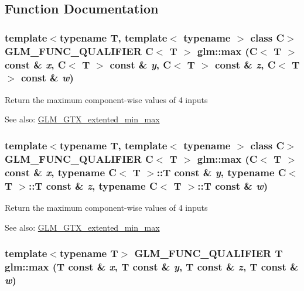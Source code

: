 \subsection{Function Documentation}
\hypertarget{group__gtx__extented__min__max_g56246e6ce859dc617425497eab1bdbd8}{
\subsubsection[max]{\setlength{\rightskip}{0pt plus 5cm}template$<$typename T, template$<$ typename $>$ class C$>$ GLM\_\-FUNC\_\-QUALIFIER C$<$ T $>$ glm::max (C$<$ T $>$ const \& {\em x}, \/  C$<$ T $>$ const \& {\em y}, \/  C$<$ T $>$ const \& {\em z}, \/  C$<$ T $>$ const \& {\em w})}}
\label{group__gtx__extented__min__max_g56246e6ce859dc617425497eab1bdbd8}


Return the maximum component-wise values of 4 inputs \begin{Desc}
\item[See also:]\hyperlink{group__gtx__extented__min__max}{GLM\_\-GTX\_\-extented\_\-min\_\-max} \end{Desc}
\hypertarget{group__gtx__extented__min__max_gad13af3c32f9a925e4ef4276bcf37ab7}{
\subsubsection[max]{\setlength{\rightskip}{0pt plus 5cm}template$<$typename T, template$<$ typename $>$ class C$>$ GLM\_\-FUNC\_\-QUALIFIER C$<$ T $>$ glm::max (C$<$ T $>$ const \& {\em x}, \/  typename C$<$ T $>$::T const \& {\em y}, \/  typename C$<$ T $>$::T const \& {\em z}, \/  typename C$<$ T $>$::T const \& {\em w})}}
\label{group__gtx__extented__min__max_gad13af3c32f9a925e4ef4276bcf37ab7}


Return the maximum component-wise values of 4 inputs \begin{Desc}
\item[See also:]\hyperlink{group__gtx__extented__min__max}{GLM\_\-GTX\_\-extented\_\-min\_\-max} \end{Desc}
\hypertarget{group__gtx__extented__min__max_g18e8664b11d2c657cb5990fa2fc32001}{
\subsubsection[max]{\setlength{\rightskip}{0pt plus 5cm}template$<$typename T$>$ GLM\_\-FUNC\_\-QUALIFIER T glm::max (T const \& {\em x}, \/  T const \& {\em y}, \/  T const \& {\em z}, \/  T const \& {\em w})}}
\label{group__gtx__extented__min__max_g18e8664b11d2c657cb5990fa2fc32001}


